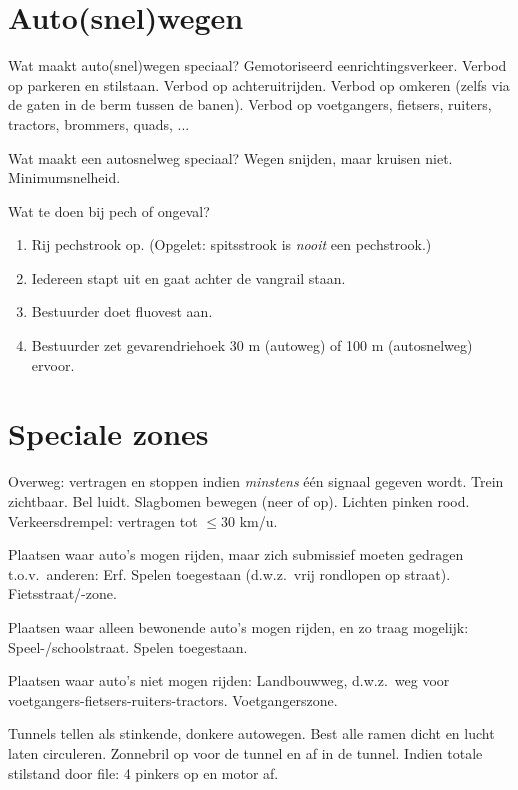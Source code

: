 \section{Auto(snel)wegen}
\begin{outline}
\1 Wat maakt auto(snel)wegen speciaal? Gemotoriseerd eenrichtingsverkeer.
	\2 Verbod op parkeren en stilstaan.
	\2 Verbod op achteruitrijden.
	\2 Verbod op omkeren (zelfs via de gaten in de berm tussen de banen).
	\2 Verbod op voetgangers, fietsers, ruiters, tractors, brommers, quads, ...

\1 Wat maakt een autosnelweg speciaal?
	\2 Wegen snijden, maar kruisen niet.
	\2 Minimumsnelheid.
	
\1 Wat te doen bij pech of ongeval?
\begin{enumerate}
	\item Rij pechstrook op. (Opgelet: spitsstrook is \emph{nooit} een pechstrook.)
	\item Iedereen stapt uit en gaat achter de vangrail staan.
	\item Bestuurder doet fluovest aan.
	\item Bestuurder zet gevarendriehoek 30 m (autoweg) of 100 m (autosnelweg) ervoor.
\end{enumerate}
\end{outline}

\section{Speciale zones}
\begin{outline}
\1 Overweg: vertragen en stoppen indien \emph{minstens} één signaal gegeven wordt.
	\2 Trein zichtbaar.
	\2 Bel luidt.
	\2 Slagbomen bewegen (neer of op).
	\2 Lichten pinken rood.
\1 Verkeersdrempel: vertragen tot $\leq$30 km/u.

\1 Plaatsen waar auto's mogen rijden, maar zich submissief moeten gedragen t.o.v.\ anderen:
	\2 Erf. Spelen toegestaan (d.w.z.\ vrij rondlopen op straat).
	\2 Fietsstraat/-zone.
	
\1 Plaatsen waar alleen bewonende auto's mogen rijden, en zo traag mogelijk:
	\2 Speel-/schoolstraat. Spelen toegestaan.

\1 Plaatsen waar auto's niet mogen rijden:
	\2 Landbouwweg, d.w.z.\ weg voor voetgangers-fietsers-ruiters-tractors.
	\2 Voetgangerszone.
	
\1 Tunnels tellen als stinkende, donkere autowegen.
	\2 Best alle ramen dicht en lucht laten circuleren.
	\2 Zonnebril op voor de tunnel en af in de tunnel.
	\2 Indien totale stilstand door file: 4 pinkers op en motor af.
\end{outline}

